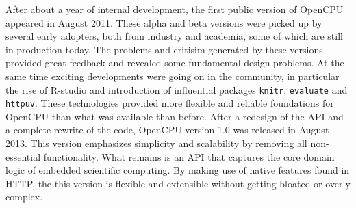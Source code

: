 After about a year of internal development, the first public version of OpenCPU appeared in August 2011. These alpha and beta versions were picked up by several early adopters, both from industry and academia, some of which are still in production today. The problems and critisim generated by these versions provided great feedback and revealed some fundamental design problems. At the same time exciting developments were going on in the \R community, in particular the rise of R-studio and introduction of influential \R packages \texttt{knitr}, \texttt{evaluate} and \texttt{httpuv}. These technologies provided more flexible and reliable foundations for OpenCPU than what was available than before. After a redesign of the API and a complete rewrite of the code, OpenCPU version  1.0 was released in August 2013. This version emphasizes simplicity and scalability by removing all non-essential functionality. What remains is an API that captures the core domain logic of embedded scientific computing. By making use of native features found in HTTP, the this version is flexible and extensible without getting bloated or overly complex.


